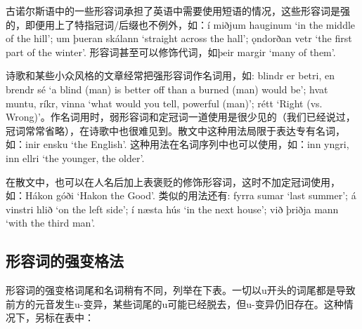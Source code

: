 古诺尔斯语中的一些形容词承担了英语中需要使用短语的情况，这些形容词是强的，即便用上了特指冠词/后缀也不例外，如：í
miðjum hauginum `in the middle of the hill‌'; um þueran skálann `straight
across the hall‌'; ǫndorðan vetr `the first part of the winter‌'.
形容词甚至可以修饰代词，如þeir margir `many of them‌'.

诗歌和某些小众风格的文章经常把强形容词作名词用，如: blindr er betri, en
brendr sé `a blind (man) is better off than a burned (man) would be‌';
hvat muntu, ríkr, vinna `what would you tell, powerful (man)‌'; rétt
`Right (vs.
Wrong)‌'。作名词用时，弱形容词和定冠词一道使用是很少见的（我们已经说过，冠词常常省略），在诗歌中也很难见到。散文中这种用法局限于表达专有名词，如：inir
ensku `the English‌'. 这种用法在名词序列中也可以使用，如：inn yngri, inn
ellri `the younger, the older‌'.

在散文中，也可以在人名后加上表褒贬的修饰形容词，这时不加定冠词使用，
如：Hákon góði `Hakon the Good‌'. 类似的用法还有: fyrra sumar `last
summer‌'; á vinstri hlið `on the left side‌'; í næsta hús `in the next
house‌'; við þriðja mann `with the third man‌'.

\subsection{形容词的强变格法}\label{ux5f62ux5bb9ux8bcdux7684ux5f3aux53d8ux683cux6cd5}

形容词的强变格词尾和名词稍有不同，列举在下表。一切以u开头的词尾都是导致前方的元音发生u-变异，某些词尾的u可能已经脱去，但u-变异仍旧存在。这种情况下，另标在表中：

